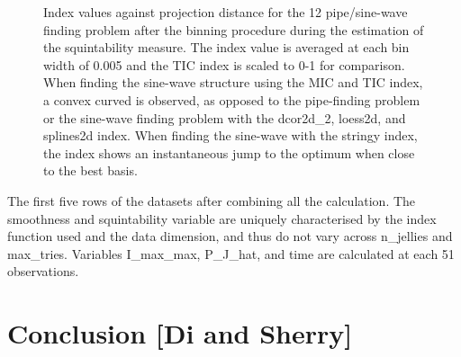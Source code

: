 \documentclass[
  number,
  preprint,
  3p]{elsarticle}
\begin{document}
\begin{figure}


\caption{\label{fig-idx-proj-dist}Index values against projection
distance for the 12 pipe/sine-wave finding problem after the binning
procedure during the estimation of the squintability measure. The index
value is averaged at each bin width of 0.005 and the TIC index is scaled
to 0-1 for comparison. When finding the sine-wave structure using the
MIC and TIC index, a convex curved is observed, as opposed to the
pipe-finding problem or the sine-wave finding problem with the
dcor2d\_2, loess2d, and splines2d index. When finding the sine-wave with
the stringy index, the index shows an instantaneous jump to the optimum
when close to the best basis.}

\end{figure}%

\begin{table}

\caption{\label{tbl-all-sim}The first five rows of the datasets after
combining all the calculation. The smoothness and squintability variable
are uniquely characterised by the index function used and the data
dimension, and thus do not vary across n\_jellies and max\_tries.
Variables I\_max\_max, P\_J\_hat, and time are calculated at each 51
observations.}

\centering{

}

\end{table}%

\section{Conclusion {[}Di and Sherry{]}}\label{sec-conclusion}


\renewcommand\refname{References}
  
\end{document}
